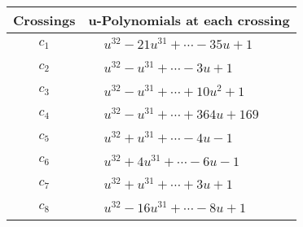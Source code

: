 \documentclass[1p]{elsarticle_modified}
\theoremstyle{definition}
\begin{document}
\begin{tabular}{m{50pt}|m{274pt}}
Crossings & \hspace{64pt}u-Polynomials at each crossing \\
\hline $$\begin{aligned}c_{1}\end{aligned}$$&$\begin{aligned}
&u^{32}-21 u^{31}+\cdots-35 u+1
\end{aligned}$\\
\hline $$\begin{aligned}c_{2}\end{aligned}$$&$\begin{aligned}
&u^{32}- u^{31}+\cdots-3 u+1
\end{aligned}$\\
\hline $$\begin{aligned}c_{3}\end{aligned}$$&$\begin{aligned}
&u^{32}- u^{31}+\cdots+10 u^2+1
\end{aligned}$\\
\hline $$\begin{aligned}c_{4}\end{aligned}$$&$\begin{aligned}
&u^{32}- u^{31}+\cdots+364 u+169
\end{aligned}$\\
\hline $$\begin{aligned}c_{5}\end{aligned}$$&$\begin{aligned}
&u^{32}+u^{31}+\cdots-4 u-1
\end{aligned}$\\
\hline $$\begin{aligned}c_{6}\end{aligned}$$&$\begin{aligned}
&u^{32}+4 u^{31}+\cdots-6 u-1
\end{aligned}$\\
\hline $$\begin{aligned}c_{7}\end{aligned}$$&$\begin{aligned}
&u^{32}+u^{31}+\cdots+3 u+1
\end{aligned}$\\
\hline $$\begin{aligned}c_{8}\end{aligned}$$&$\begin{aligned}
&u^{32}-16 u^{31}+\cdots-8 u+1
\end{aligned}$\\

\end{tabular}
\end{document}
